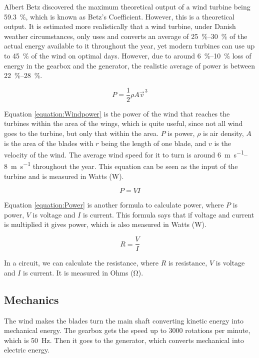 \documentclass[12pt]{article}
\begin{document}
Albert Betz discovered the maximum theoretical output of a wind turbine being \SI{59,3}{\percent}, which is known as Betz's Coefficient.
However, this is a theoretical output.
It is estimated more realistically that a wind turbine, under Danish weather circumstances, only uses and converts an average of \SIrange{25}{30}{\percent} of the actual energy available to it throughout the year, yet modern turbines can use up to \SI{45}{\percent} of the wind on optimal days.
However, due to around \SIrange{6}{10}{\percent} loss of energy in the gearbox and the generator, the realistic average of power is between \SIrange{22}{28}{\percent}.

\begin{equation}
  P = \frac{1}{2} \rho A \vec{v}^{\,3}
  \label{equation:Windpower}
\end{equation}

Equation \ref{equation:Windpower} is the power of the wind that reaches the turbines within the area of the wings, which is quite useful, since not all wind goes to the turbine, but only that within the area.
$P$ is power, $\rho$ is air density, $A$ is the area of the blades with $r$ being the length of one blade, and $v$ is the velocity of the wind.
The average wind speed for it to turn is around \SIrange{6}{8}{\metre\per\second} throughout the year.
This equation can be seen as the input of the turbine and is measured in Watts (\si{\watt}).

\begin{equation}
  P=VI
  \label{equation:Power}
\end{equation}

Equation \ref{equation:Power} is another formula to calculate power, where $P$ is power, $V$ is voltage and $I$ is current.
This formula says that if voltage and current is multiplied it gives power, which is also measured in Watts (\si{\watt}).

\begin{equation}
  R = \frac{V}{I}
  \label{equation:Ohmslaw}
\end{equation}

In a circuit, we can calculate the resistance, where $R$ is resistance, $V$ is voltage and $I$ is current.
It is measured in Ohms (\si{\ohm}).

\subsection{Mechanics}
The wind makes the blades turn the main shaft converting kinetic energy into mechanical energy.
The gearbox gets the speed up to 3000 rotations per minute, which is \SI{50}{\hertz}.
Then it goes to the generator, which converts mechanical into electric energy.
\end{document}
